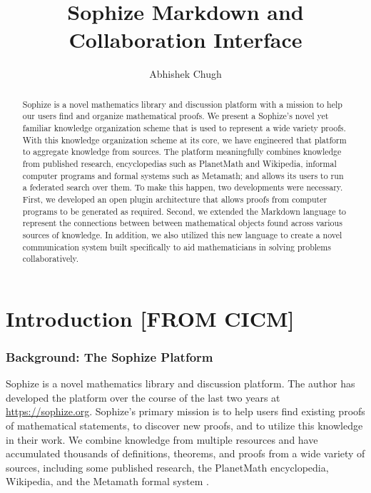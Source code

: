 \documentclass[a4paper]{article}
\title{Sophize Markdown and Collaboration Interface }
\author{ Abhishek Chugh }
\begin{document}
\maketitle

\begin{abstract}
Sophize is a novel mathematics library and discussion platform with a mission to help our users find and organize mathematical proofs. We present a Sophize's novel yet familiar knowledge organization scheme that is used to represent a wide variety proofs. With this knowledge organization scheme at its core, we have engineered that platform to aggregate knowledge from sources. The platform meaningfully combines knowledge from published research, encyclopedias such as PlanetMath and Wikipedia, informal computer programs and formal systems such as Metamath; and allows its users to run a federated search over them. To make this happen, two developments were necessary. First, we developed an open plugin architecture that allows proofs from computer programs to be generated as required. Second, we extended the Markdown language to represent the connections between between mathematical objects found across various sources of knowledge. In addition, we also utilized this new language to create a novel communication system built specifically to aid mathematicians in solving problems collaboratively.

\end{abstract}

\vskip 32pt

\section{Introduction [FROM CICM]}

\subsubsection*{Background: The Sophize Platform}

Sophize is a novel mathematics library and discussion platform. The author has developed the platform over the course of the last two years at \url{https://sophize.org}. Sophize's primary mission is to help users find existing proofs of mathematical statements, to discover new proofs, and to utilize this knowledge in their work. We combine knowledge from multiple resources and have accumulated thousands of definitions, theorems, and proofs from a wide variety of sources, including some published research, the PlanetMath encyclopedia, Wikipedia, and the Metamath formal system \cite{metamath}.
\end{document}
